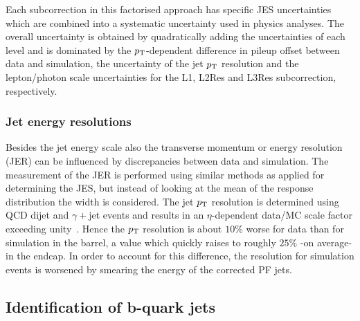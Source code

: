 Each subcorrection in this factorised approach has specific JES uncertainties which are combined into a systematic uncertainty used in physics analyses. The overall uncertainty is obtained by quadratically adding the uncertainties of each level and is dominated by the $p_{\rm T}$-dependent difference in pileup offset between data and simulation, the uncertainty of the jet $p_{\rm T}$ resolution and the lepton/photon scale uncertainties for the L1, L2Res and L3Res subcorrection, respectively.

\subsubsection*{Jet energy resolutions}
Besides the jet energy scale also the transverse momentum or energy resolution (JER) can be influenced by discrepancies between data and simulation. %
The measurement of the JER is performed using similar methods as applied for determining the JES, but instead of looking at the mean of the response distribution the width is considered.
The jet $p_{\rm T}$ resolution is determined using QCD dijet and $\gamma+$jet events and results in an $\eta$-dependent data/MC scale factor exceeding unity~\cite{JES}. Hence the $p_{\rm T}$ resolution is about $10 \%$ worse for data than for simulation in the barrel, a value which quickly raises to roughly $25\%$ -on average- in the endcap. In order to account for this difference, the resolution for simulation events is worsened by smearing the energy of the corrected PF jets.

\subsection{Identification of b-quark jets} \label{subsec::bJetIdent}

